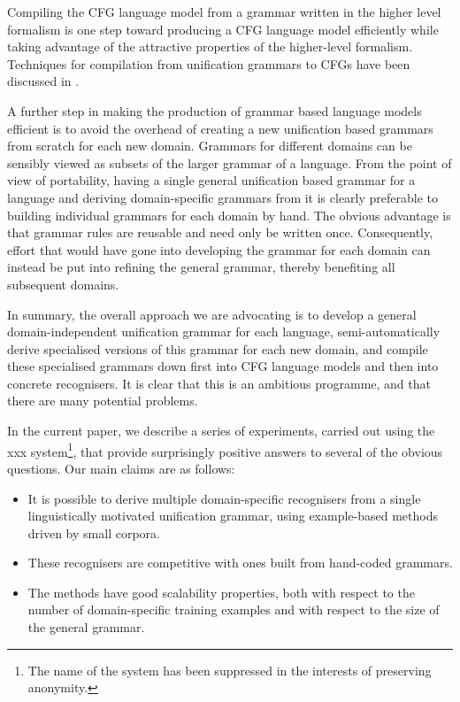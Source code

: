 \documentclass[11pt]{article}
\begin{document}
Compiling the CFG language model from a grammar written in the higher
level formalism is one step toward producing a CFG language model efficiently
while taking advantage of the attractive properties of the
higher-level formalism. Techniques for compilation from unification
grammars to CFGs have been discussed in
\cite{Moore1998,ChappelierEA1999,KieferKrieger2000,DowdingEA2001,RaynerDowdingHockey2001,Bos2002}.
 
A further step in making the production of grammar based language
models efficient is to avoid the overhead of creating a new unification
based grammars from scratch for each new domain. Grammars for
different domains can be sensibly viewed as subsets of the larger
grammar of a language. From the point of view of portability, having a
single general unification based grammar for a language and deriving
domain-specific grammars from it is clearly preferable to building
individual grammars for each domain by hand. The obvious advantage is
that grammar rules are reusable and need only be written
once. Consequently, effort that would have gone into developing the
grammar for each domain can instead be put into refining the general
grammar, thereby benefiting all subsequent domains.

In summary, the overall approach we are advocating is to develop a
general domain-independent unification grammar for each language,
semi-automatically derive specialised versions of this grammar for
each new domain, and compile these specialised grammars down first
into CFG language models and then into concrete recognisers. It is
clear that this is an ambitious programme, and that there are many
potential problems. 

In the current paper, we describe a series of experiments, carried out
using the {\sc xxx} system\footnote{The name of the system has been
suppressed in the interests of preserving anonymity.}, that provide
surprisingly positive answers to several of the obvious questions.
Our main claims are as follows:

\begin{itemize}

\item It is possible to derive multiple domain-specific recognisers
from a single linguistically motivated unification grammar, using
example-based methods driven by small corpora.

\item These recognisers are competitive with ones built from
hand-coded grammars.

\item The methods have good scalability properties, both with respect
to the number of domain-specific training examples and with respect to
the size of the general grammar.

\end{itemize}
\end{document}
